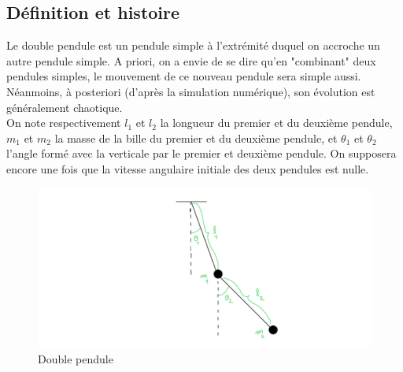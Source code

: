 \documentclass[9pt,a4paper]{article}
\begin{document}
\subsection{Définition et histoire}
Le double pendule est un pendule simple à l'extrémité duquel on accroche un autre pendule simple. A priori, on a envie de se dire qu'en "combinant" deux pendules simples, le mouvement de ce nouveau pendule sera simple aussi. Néanmoins, à posteriori (d'après la simulation numérique), son évolution est généralement chaotique.\\
On note respectivement $l_1$ et $l_2$ la longueur du premier et du deuxième pendule, $m_1$ et $m_2$ la masse de la bille du premier et du deuxième pendule, et $\theta_1$ et $\theta_2$ l'angle formé avec la verticale par le premier et deuxième pendule. On supposera encore une fois que la vitesse angulaire initiale des deux pendules est nulle.
\\
\begin{figure}[!h]
  \centering
  \includegraphics[scale=0.2]{schema_double_pendule.png}
  \caption{Double pendule}
  \label{fig:double pendule}
\end{figure}
\\
\end{document}
